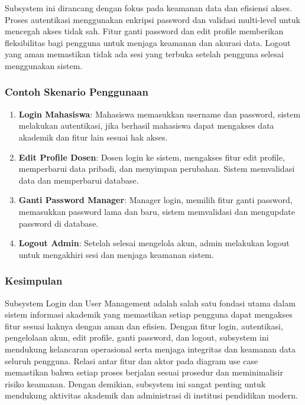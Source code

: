 \documentclass[a4paper,oneside,11pt]{book}
\begin{document}
Subsystem ini dirancang dengan fokus pada keamanan data dan efisiensi akses. Proses autentikasi menggunakan enkripsi password dan validasi multi-level untuk mencegah akses tidak sah. Fitur ganti password dan edit profile memberikan fleksibilitas bagi pengguna untuk menjaga keamanan dan akurasi data. Logout yang aman memastikan tidak ada sesi yang terbuka setelah pengguna selesai menggunakan sistem.

\subsubsection{Contoh Skenario Penggunaan}

\begin{enumerate}
  \item \textbf{Login Mahasiswa}: Mahasiswa memasukkan username dan password, sistem melakukan autentikasi, jika berhasil mahasiswa dapat mengakses data akademik dan fitur lain sesuai hak akses.
  \item \textbf{Edit Profile Dosen}: Dosen login ke sistem, mengakses fitur edit profile, memperbarui data pribadi, dan menyimpan perubahan. Sistem memvalidasi data dan memperbarui database.
  \item \textbf{Ganti Password Manager}: Manager login, memilih fitur ganti password, memasukkan password lama dan baru, sistem memvalidasi dan mengupdate password di database.
  \item \textbf{Logout Admin}: Setelah selesai mengelola akun, admin melakukan logout untuk mengakhiri sesi dan menjaga keamanan sistem.
\end{enumerate}

\subsubsection{Kesimpulan}

Subsystem Login dan User Management adalah salah satu fondasi utama dalam sistem informasi akademik yang memastikan setiap pengguna dapat mengakses fitur sesuai haknya dengan aman dan efisien. Dengan fitur login, autentikasi, pengelolaan akun, edit profile, ganti password, dan logout, subsystem ini mendukung kelancaran operasional serta menjaga integritas dan keamanan data seluruh pengguna. Relasi antar fitur dan aktor pada diagram use case memastikan bahwa setiap proses berjalan sesuai prosedur dan meminimalisir risiko keamanan. Dengan demikian, subsystem ini sangat penting untuk mendukung aktivitas akademik dan administrasi di institusi pendidikan modern.
\end{document}
